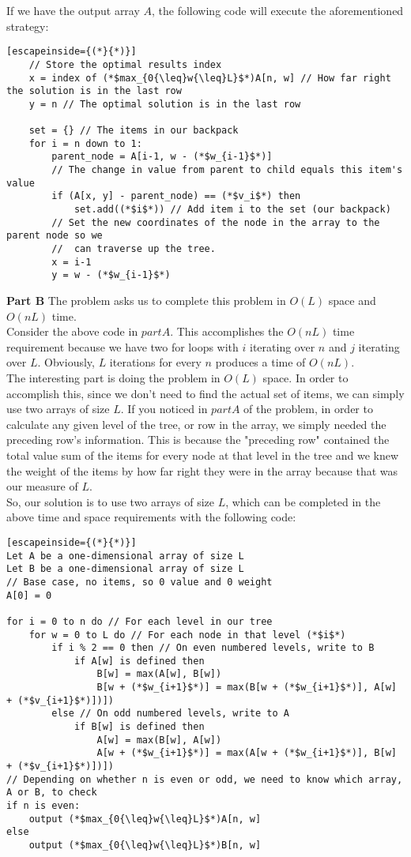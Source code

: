 \documentclass{article}
\begin{document}
	If we have the output array $A$, the following code will execute the aforementioned strategy:

	\begin{lstlisting}[escapeinside={(*}{*)}]
	// Store the optimal results index
	x = index of (*$max_{0{\leq}w{\leq}L}$*)A[n, w] // How far right the solution is in the last row
	y = n // The optimal solution is in the last row

	set = {} // The items in our backpack
	for i = n down to 1:
		parent_node = A[i-1, w - (*$w_{i-1}$*)]
		// The change in value from parent to child equals this item's value
		if (A[x, y] - parent_node) == (*$v_i$*) then
			set.add((*$i$*)) // Add item i to the set (our backpack)
		// Set the new coordinates of the node in the array to the parent node so we
		// 	can traverse up the tree.
		x = i-1
		y = w - (*$w_{i-1}$*)
	\end{lstlisting}

	\textbf{Part B} The problem asks us to complete this problem in $O(L)$ space and $O(nL)$ time.\\

	Consider the above code in $part A$.  This accomplishes the $O(nL)$ time requirement because we have two for loops with $i$ iterating over $n$ and $j$ iterating over $L$.  Obviously, $L$ iterations for every $n$ produces a time of $O(nL)$.  \\

	The interesting part is doing the problem in $O(L)$ space.  In order to accomplish this, since we don't need to find the actual set of items, we can simply use two arrays of size $L$.  If you noticed in $part A$ of the problem, in order to calculate any given level of the tree, or row in the array, we simply needed the preceding row's information.  This is because the "preceding row" contained the total value sum of the items for every node at that level in the tree and we knew the weight of the items by how far right they were in the array because that was our measure of $L$.\\

	So, our solution is to use two arrays of size $L$, which can be completed in the above time and space requirements with the following code:
	\begin{lstlisting}[escapeinside={(*}{*)}]
Let A be a one-dimensional array of size L
Let B be a one-dimensional array of size L
// Base case, no items, so 0 value and 0 weight
A[0] = 0

for i = 0 to n do // For each level in our tree
	for w = 0 to L do // For each node in that level (*$i$*)
		if i % 2 == 0 then // On even numbered levels, write to B
			if A[w] is defined then
				B[w] = max(A[w], B[w])
				B[w + (*$w_{i+1}$*)] = max(B[w + (*$w_{i+1}$*)], A[w] + (*$v_{i+1}$*)])])
		else // On odd numbered levels, write to A
			if B[w] is defined then
				A[w] = max(B[w], A[w])
				A[w + (*$w_{i+1}$*)] = max(A[w + (*$w_{i+1}$*)], B[w] + (*$v_{i+1}$*)])])
// Depending on whether n is even or odd, we need to know which array, A or B, to check
if n is even:
	output (*$max_{0{\leq}w{\leq}L}$*)A[n, w]
else
	output (*$max_{0{\leq}w{\leq}L}$*)B[n, w]
	\end{lstlisting}
\end{document}
